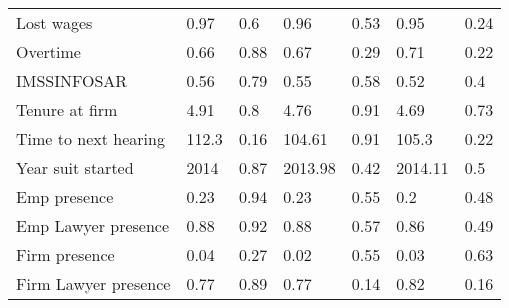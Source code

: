 \begin{tabular}{lrrrrrr}
Lost wages & \multicolumn{1}{l}{0.97} & \multicolumn{1}{l}{0.6} & \multicolumn{1}{l}{0.96} & \multicolumn{1}{l}{0.53} & \multicolumn{1}{l}{0.95} & \multicolumn{1}{l}{0.24} \\
Overtime & \multicolumn{1}{l}{0.66} & \multicolumn{1}{l}{0.88} & \multicolumn{1}{l}{0.67} & \multicolumn{1}{l}{0.29} & \multicolumn{1}{l}{0.71} & \multicolumn{1}{l}{0.22} \\
IMSSINFOSAR  & \multicolumn{1}{l}{0.56} & \multicolumn{1}{l}{0.79} & \multicolumn{1}{l}{0.55} & \multicolumn{1}{l}{0.58} & \multicolumn{1}{l}{0.52} & \multicolumn{1}{l}{0.4} \\
Tenure at firm & \multicolumn{1}{l}{4.91} & \multicolumn{1}{l}{0.8} & \multicolumn{1}{l}{4.76} & \multicolumn{1}{l}{0.91} & \multicolumn{1}{l}{4.69} & \multicolumn{1}{l}{0.73} \\
Time to next hearing & \multicolumn{1}{l}{112.3} & \multicolumn{1}{l}{0.16} & \multicolumn{1}{l}{104.61} & \multicolumn{1}{l}{0.91} & \multicolumn{1}{l}{105.3} & \multicolumn{1}{l}{0.22} \\
Year suit started & \multicolumn{1}{l}{2014} & \multicolumn{1}{l}{0.87} & \multicolumn{1}{l}{2013.98} & \multicolumn{1}{l}{0.42} & \multicolumn{1}{l}{2014.11} & \multicolumn{1}{l}{0.5} \\
\midrule
Emp presence & \multicolumn{1}{l}{0.23} & \multicolumn{1}{l}{0.94} & \multicolumn{1}{l}{0.23} & \multicolumn{1}{l}{0.55} & \multicolumn{1}{l}{0.2} & \multicolumn{1}{l}{0.48} \\
Emp Lawyer presence & \multicolumn{1}{l}{0.88} & \multicolumn{1}{l}{0.92} & \multicolumn{1}{l}{0.88} & \multicolumn{1}{l}{0.57} & \multicolumn{1}{l}{0.86} & \multicolumn{1}{l}{0.49} \\
Firm presence & \multicolumn{1}{l}{0.04} & \multicolumn{1}{l}{0.27} & \multicolumn{1}{l}{0.02} & \multicolumn{1}{l}{0.55} & \multicolumn{1}{l}{0.03} & \multicolumn{1}{l}{0.63} \\
Firm Lawyer presence & \multicolumn{1}{l}{0.77} & \multicolumn{1}{l}{0.89} & \multicolumn{1}{l}{0.77} & \multicolumn{1}{l}{0.14} & \multicolumn{1}{l}{0.82} & \multicolumn{1}{l}{0.16} \\
\bottomrule
\bottomrule
\end{tabular}%
